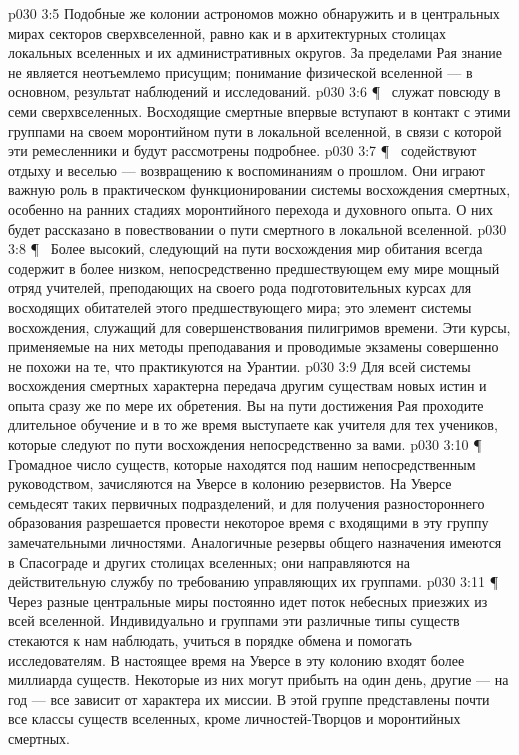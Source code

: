 \vs p030 3:5 Подобные же колонии астрономов можно обнаружить и в центральных мирах секторов сверхвселенной, равно как и в архитектурных столицах локальных вселенных и их административных округов. За пределами Рая знание не является неотъемлемо присущим; понимание физической вселенной --- в основном, результат наблюдений и исследований.
\vs p030 3:6 \P\ \bibnobreakspace {} служат повсюду в семи сверхвселенных. Восходящие смертные впервые вступают в контакт с этими группами на своем моронтийном пути в локальной вселенной, в связи с которой эти ремесленники и будут рассмотрены подробнее.
\vs p030 3:7 \P\ \bibnobreakspace {} содействуют отдыху и веселью --- возвращению к воспоминаниям о прошлом. Они играют важную роль в практическом функционировании системы восхождения смертных, особенно на ранних стадиях моронтийного перехода и духовного опыта. О них будет рассказано в повествовании о пути смертного в локальной вселенной.
\vs p030 3:8 \P\ \bibnobreakspace {} Более высокий, следующий на пути восхождения мир обитания всегда содержит в более низком, непосредственно предшествующем ему мире мощный отряд учителей, преподающих на своего рода подготовительных курсах для восходящих обитателей этого предшествующего мира; это элемент системы восхождения, служащий для совершенствования пилигримов времени. Эти курсы, применяемые на них методы преподавания и проводимые экзамены совершенно не похожи на те, что практикуются на Урантии.
\vs p030 3:9 Для всей системы восхождения смертных характерна передача другим существам новых истин и опыта сразу же по мере их обретения. Вы на пути достижения Рая проходите длительное обучение и в то же время выступаете как учителя для тех учеников, которые следуют по пути восхождения непосредственно за вами.
\vs p030 3:10 \P\ \bibnobreakspace {} Громадное число существ, которые находятся под нашим непосредственным руководством, зачисляются на Уверсе в колонию резервистов. На Уверсе семьдесят таких первичных подразделений, и для получения разностороннего образования разрешается провести некоторое время с входящими в эту группу замечательными личностями. Аналогичные резервы общего назначения имеются в Спасограде и других столицах вселенных; они направляются на действительную службу по требованию управляющих их группами.
\vs p030 3:11 \P\ \bibnobreakspace {} Через разные центральные миры постоянно идет поток небесных приезжих из всей вселенной. Индивидуально и группами эти различные типы существ стекаются к нам наблюдать, учиться в порядке обмена и помогать исследователям. В настоящее время на Уверсе в эту колонию входят более миллиарда существ. Некоторые из них могут прибыть на один день, другие --- на год --- все зависит от характера их миссии. В этой группе представлены почти все классы существ вселенных, кроме личностей\hyp{}Творцов и моронтийных смертных.

